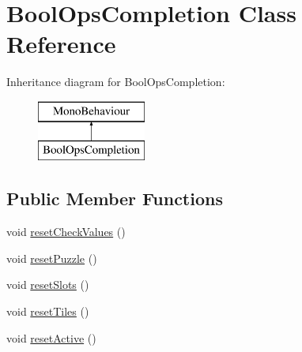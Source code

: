 \hypertarget{class_bool_ops_completion}{}\section{Bool\+Ops\+Completion Class Reference}
\label{class_bool_ops_completion}
Inheritance diagram for Bool\+Ops\+Completion\+:\begin{figure}[H]
\begin{center}
\leavevmode
\includegraphics[height=2.000000cm]{class_bool_ops_completion}
\end{center}
\end{figure}
\subsection*{Public Member Functions}
\begin{DoxyCompactItemize}
\item 
void \hyperlink{class_bool_ops_completion_aa37088b2b4f2f10bffcfdb9accb2fde5}{reset\+Check\+Values} ()
\item 
void \hyperlink{class_bool_ops_completion_acf53c594f26e55aabd250724dc92ba53}{reset\+Puzzle} ()
\item 
void \hyperlink{class_bool_ops_completion_a6ce981e2a1853f4708ff01db8eabdcd9}{reset\+Slots} ()
\item 
void \hyperlink{class_bool_ops_completion_a665c424ab9487b5cf663921b38b86a1c}{reset\+Tiles} ()
\item 
void \hyperlink{class_bool_ops_completion_a49619737dd343ae03519ff6db1eeebc2}{reset\+Active} ()
\end{DoxyCompactItemize}
